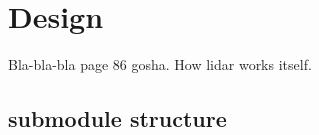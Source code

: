 \chapter{Design}
Bla-bla-bla page 86 gosha.
How lidar works itself.

\section{submodule structure}


